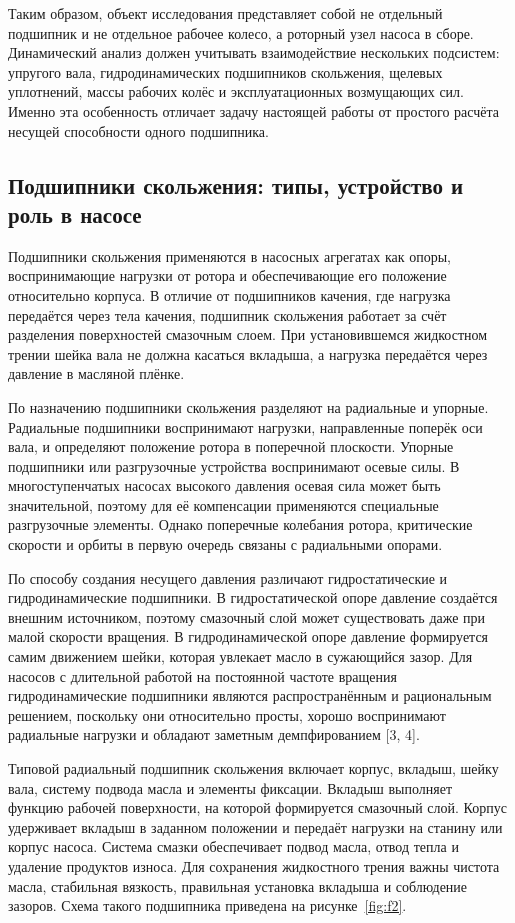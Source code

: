 Таким образом, объект исследования представляет собой не отдельный подшипник и не отдельное рабочее колесо, а роторный узел насоса в сборе. Динамический анализ должен учитывать взаимодействие нескольких подсистем: упругого вала, гидродинамических подшипников скольжения, щелевых уплотнений, массы рабочих колёс и эксплуатационных возмущающих сил. Именно эта особенность отличает задачу настоящей работы от простого расчёта несущей способности одного подшипника.

\subsection{Подшипники скольжения: типы, устройство и роль в насосе}

Подшипники скольжения применяются в насосных агрегатах как опоры, воспринимающие нагрузки от ротора и обеспечивающие его положение относительно корпуса. В отличие от подшипников качения, где нагрузка передаётся через тела качения, подшипник скольжения работает за счёт разделения поверхностей смазочным слоем. При установившемся жидкостном трении шейка вала не должна касаться вкладыша, а нагрузка передаётся через давление в масляной плёнке.

По назначению подшипники скольжения разделяют на радиальные и упорные. Радиальные подшипники воспринимают нагрузки, направленные поперёк оси вала, и определяют положение ротора в поперечной плоскости. Упорные подшипники или разгрузочные устройства воспринимают осевые силы. В многоступенчатых насосах высокого давления осевая сила может быть значительной, поэтому для её компенсации применяются специальные разгрузочные элементы. Однако поперечные колебания ротора, критические скорости и орбиты в первую очередь связаны с радиальными опорами.

По способу создания несущего давления различают гидростатические и гидродинамические подшипники. В гидростатической опоре давление создаётся внешним источником, поэтому смазочный слой может существовать даже при малой скорости вращения. В гидродинамической опоре давление формируется самим движением шейки, которая увлекает масло в сужающийся зазор. Для насосов с длительной работой на постоянной частоте вращения гидродинамические подшипники являются распространённым и рациональным решением, поскольку они относительно просты, хорошо воспринимают радиальные нагрузки и обладают заметным демпфированием [3, 4].

Типовой радиальный подшипник скольжения включает корпус, вкладыш, шейку вала, систему подвода масла и элементы фиксации. Вкладыш выполняет функцию рабочей поверхности, на которой формируется смазочный слой. Корпус удерживает вкладыш в заданном положении и передаёт нагрузки на станину или корпус насоса. Система смазки обеспечивает подвод масла, отвод тепла и удаление продуктов износа. Для сохранения жидкостного трения важны чистота масла, стабильная вязкость, правильная установка вкладыша и соблюдение зазоров. Схема такого подшипника приведена на рисунке~\ref{fig:f2}.

